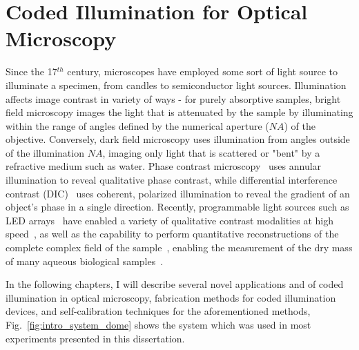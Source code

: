 \section{Coded Illumination for Optical Microscopy}

Since the 17$^{th}$ century, microscopes have employed some sort of light source to illuminate a specimen, from candles to semiconductor light sources. Illumination affects image contrast in variety of ways - for purely absorptive samples, bright field microscopy images the light that is attenuated by the sample by illuminating within the range of angles defined by the numerical aperture ($NA$) of the objective. Conversely, dark field microscopy uses illumination from angles outside of the illumination $NA$, imaging only light that is scattered or "bent" by a refractive medium such as water. Phase contrast microscopy~\cite{zernike1942phase} uses annular illumination to reveal qualitative phase contrast, while differential interference contrast (DIC)~\cite{smithDIC} uses coherent, polarized illumination to reveal the gradient of an object's phase in a single direction. Recently, programmable light sources such as LED arrays~\cite{Zheng2011, albeanu2008led} have enabled a variety of qualitative contrast modalities at high speed~\cite{Zheng2011, zijiMulti}, as well as the capability to perform quantitative reconstructions of the complete complex field of the sample~\cite{Tian3dDpc, Zheng2013, tian2015quantitative}, enabling the measurement of the dry mass of many aqueous biological samples~\cite{popescu2008imaging, popescu2008optical}.

In the following chapters, I will describe several novel applications and of coded illumination in optical microscopy, fabrication methods for coded illumination devices, and self-calibration techniques for the aforementioned methods, Fig.~\ref{fig:intro_system_dome} shows the system which was used in most experiments presented in this dissertation.

